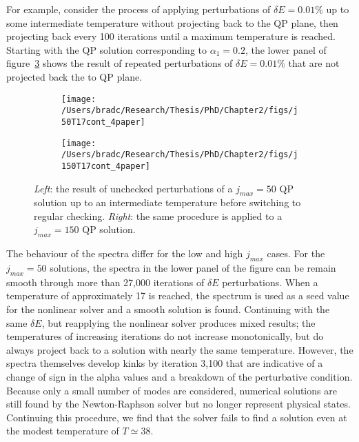 \documentclass[../PhD.tex]{subfiles}
\begin{document}
\begin{subappendices}
For example, consider the process of applying perturbations of $\delta E = 0.01\%$ up to some intermediate temperature without projecting back to the QP plane, then projecting back every 100 iterations until a maximum temperature is reached. Starting with the QP solution corresponding to $\alpha_1 = 0.2$, the lower panel of figure~\ref{fig: reop check} shows the result of repeated perturbations of $\delta E = 0.01\%$ that are not projected back the to QP plane.

\begin{figure}[h]
	\centering
	\begin{subfigure}[t]{0.48\textwidth}
		\texttt{[image: /Users/bradc/Research/Thesis/PhD/Chapter2/figs/j50T17cont\_4paper]}
		\label{fig: reop check j50}
	\end{subfigure}
	\;
	\begin{subfigure}[t]{0.48\textwidth}
		\texttt{[image: /Users/bradc/Research/Thesis/PhD/Chapter2/figs/j150T17cont\_4paper]}
		\label{fig: reop check j150}
	\end{subfigure}
\caption{{\it Left}: the result of unchecked perturbations of a $j_{max} = 50$ QP solution up to an intermediate temperature before switching to regular checking. {\it Right}: the same procedure is applied to a $j_{max}=150$ QP solution.}
\label{fig: reop check}
\end{figure}

The behaviour of the spectra differ for the low and high $j_{max}$ cases. For the $j_{max}=50$ solutions, the spectra in the lower panel of the figure can be remain smooth through more than 27,000 iterations of $\delta E$ perturbations. When a temperature of approximately 17 is reached, the spectrum is used as a seed value for the nonlinear solver and a smooth solution is found. Continuing with the same $\delta E$, but reapplying the nonlinear solver produces mixed results; the temperatures of increasing iterations do not increase monotonically, but do always project back to a solution with nearly the same temperature. However, the spectra themselves develop kinks by iteration 3,100 that are indicative of a change of sign in the alpha values and a breakdown of the perturbative condition. Because only a small number of modes are considered, numerical solutions are still found by the Newton-Raphson solver but no longer represent physical states. Continuing this procedure, we find that the solver fails to find a solution even at the modest temperature of $T \simeq 38$.


\end{subappendices}
\end{document}
